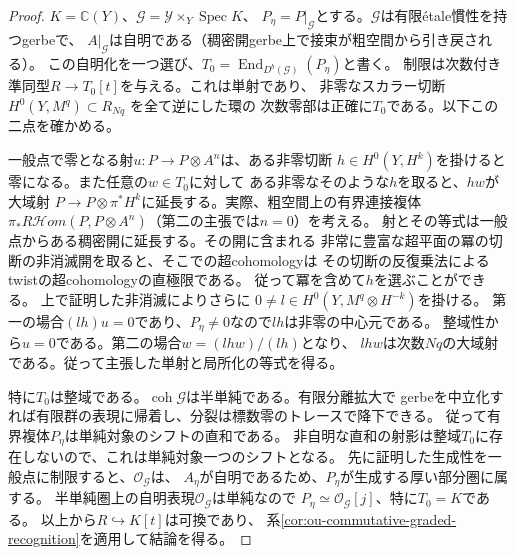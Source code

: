 \documentclass[11pt,a4paper]{ltjsarticle}
\theoremstyle{definition}
\newcommand{\coh}{\operatorname{coh}}
\begin{document}
\begin{proof}
$K=\mathbb C(Y)$、$\mathcal G=\mathcal Y\times_Y\operatorname{Spec}K$、
$P_\eta=P|_{\mathcal G}$とする。$\mathcal G$は有限étale慣性を持つgerbeで、
$A|_{\mathcal G}$は自明である（稠密開gerbe上で接束が粗空間から引き戻される）。
この自明化を一つ選び、$T_0=\operatorname{End}_{D^b(\mathcal G)}(P_\eta)$と書く。
制限は次数付き準同型$R\to T_0[t]$を与える。これは単射であり、
非零なスカラー切断 $H^0(Y,M^q)\subset R_{Nq}$ を全て逆にした環の
次数零部は正確に$T_0$である。以下この二点を確かめる。

一般点で零となる射$u:P\to P\otimes A^n$は、ある非零切断
$h\in H^0(Y,H^k)$を掛けると零になる。また任意の$w\in T_0$に対して
ある非零なそのような$h$を取ると、$hw$が大域射
$P\to P\otimes\pi^*H^k$に延長する。実際、粗空間上の有界連接複体
$\pi_*R\mathcal H om(P,P\otimes A^n)$（第二の主張では$n=0$）を考える。
射とその等式は一般点からある稠密開に延長する。その開に含まれる
非常に豊富な超平面の冪の切断の非消滅開を取ると、そこでの超cohomologyは
その切断の反復乗法によるtwistの超cohomologyの直極限である。
従って冪を含めて$h$を選ぶことができる。
上で証明した非消滅によりさらに
$0\ne l\in H^0(Y,M^q\otimes H^{-k})$を掛ける。
第一の場合$(lh)u=0$であり、$P_\eta\ne0$なので$lh$は非零の中心元である。
整域性から$u=0$である。第二の場合$w=(lhw)/(lh)$となり、
$lhw$は次数$Nq$の大域射である。従って主張した単射と局所化の等式を得る。

特に$T_0$は整域である。$\coh\mathcal G$は半単純である。有限分離拡大で
gerbeを中立化すれば有限群の表現に帰着し、分裂は標数零のトレースで降下できる。
従って有界複体$P_\eta$は単純対象のシフトの直和である。
非自明な直和の射影は整域$T_0$に存在しないので、これは単純対象一つのシフトとなる。
先に証明した生成性を一般点に制限すると、$\mathcal O_{\mathcal G}$は、
$A_\eta$が自明であるため、$P_\eta$が生成する厚い部分圏に属する。
半単純圏上の自明表現$\mathcal O_{\mathcal G}$は単純なので
$P_\eta\simeq\mathcal O_{\mathcal G}[j]$、特に$T_0=K$である。
以上から$R\hookrightarrow K[t]$は可換であり、
系\ref{cor:ou-commutative-graded-recognition}を適用して結論を得る。
\end{proof}
\end{document}
